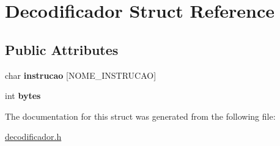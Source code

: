 \hypertarget{structDecodificador}{}\section{Decodificador Struct Reference}
\label{structDecodificador}
\subsection*{Public Attributes}
\begin{DoxyCompactItemize}
\item 
\mbox{\label{structDecodificador_abd91e4ab4dc0ec38489f2c487132ccff}} 
char {\bfseries instrucao} \mbox{[}N\+O\+M\+E\+\_\+\+I\+N\+S\+T\+R\+U\+C\+AO\mbox{]}
\item 
\mbox{\label{structDecodificador_a7081a89f9d4428ef33fb56f647363f72}} 
int {\bfseries bytes}
\end{DoxyCompactItemize}


The documentation for this struct was generated from the following file\+:\begin{DoxyCompactItemize}
\item 
\hyperlink{decodificador_8h}{decodificador.\+h}\end{DoxyCompactItemize}
